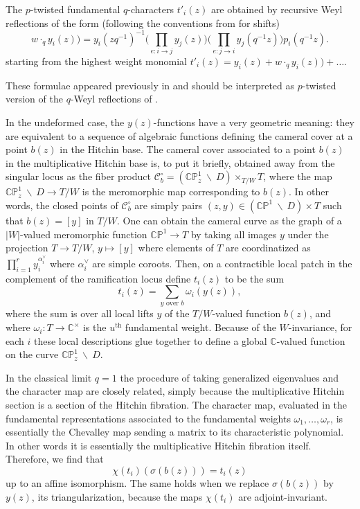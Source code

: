 \documentclass[11pt, oneside, reqno]{amsart}
\theoremstyle{definition} \newtheorem{definition}{Definition}[section]
\theoremstyle{definition} \newtheorem{remark}[definition]{Remark}
\theoremstyle{definition} \newtheorem{remarks}[definition]{Remarks}
\theoremstyle{definition} \newtheorem{question}[definition]{Question}
\theoremstyle{definition} \newtheorem*{note}{Note}
\theoremstyle{definition} \newtheorem{example}[definition]{Example}
\theoremstyle{definition} \newtheorem{examples}[definition]{Examples}
\newcommand{\bb}[1]{\mathbb{#1}}
\newcommand{\mc}[1]{\mathcal{#1}}
\newcommand{\bs}{\ \backslash \ }
\begin{document}
The $p$-twisted fundamental $q$-characters $t'_i(z)$ are obtained by recursive Weyl reflections of the form \cite{NekrasovPestun,NekrasovPestunShatashvili,Nekrasov:2015wsu} (following the conventions from \cite{Kimura:2015rgi} for shifts)
\begin{equation}
  w \cdot_q y_i(z)) = y_{i}(z q^{-1})^{-1} \Bigg(\prod_{e: i \to j} y_j(z) \Bigg) \Bigg(\prod_{e: j\to i} y_j(q^{-1} z)\Bigg)  p_{i}( q^{-1} z).
  \label{iWeyl_action}
\end{equation}
starting from the highest weight monomial $t'_i(z) = y_i(z) +  w \cdot_q y_i(z)) + \dots $. 

These formulae appeared previously in \cite{NekrasovPestun, NekrasovPestunShatashvili} and
should be interpreted as $p$-twisted version of the $q$-Weyl reflections of \cite{FrenkelReshetikhin2,FrenkelReshetikhinSTS,FrenkelReshetikhin1,Frenkel2001}.

In the undeformed case, the $y(z)$-functions have a very geometric meaning: they are equivalent to a sequence of algebraic functions defining the cameral cover at a point $b(z)$ in the Hitchin base.  The cameral cover associated to a point $b(z)$ in the multiplicative Hitchin base is, to put it briefly, obtained away from the singular locus as the fiber product $\mc C_b^\circ = (\bb{CP}^1_z \bs D) \times_{T/W} T$, where the map $\bb{CP}^1_z \bs D \to T/W$ is the meromorphic map corresponding to $b(z)$.  In other words, the closed points of $\mc C^\circ_b$ are simply pairs $(z, y) \in (\bb{CP}^1 \bs D) \times T$ such that $b(z) = [y]$ in $T/W$.  One can obtain the cameral curve as the graph of a $|W|$-valued
meromorphic function $\bb{CP}^1 \to T$ by
taking all images $y$ under the projection $T \to T/W$, $y \mapsto [y]$ where elements of $T$ are
coordinatized as  $\prod_{i = 1}^{r} y_i^{\alpha_i^{\vee}}$ where $\alpha_i^{\vee}$ are simple coroots.
Then, on a contractible local patch in the complement of the ramification locus define $t_i(z)$ to be the sum 
\[t_i(z) = \sum_{y \text{ over } b} \omega_i(y(z)),\]
where the sum is over all local lifts $y$ of the $T/W$-valued function $b(z)$, and where $\omega_i \colon T \to \mathbb{C}^{\times}$ is the $u^\text{th}$ fundamental weight. Because of the $W$-invariance, for each $i$ these local descriptions glue together to define a global $\mathbb{C}$-valued function on the curve $\bb{CP}^1_z \bs D$.

In the classical limit $q=1$ the procedure of taking generalized eigenvalues and the character map are closely related, simply because the multiplicative Hitchin section is a section of the Hitchin fibration.  The character map, evaluated in the fundamental representations associated to the fundamental weights $\omega_1, \ldots, \omega_r$, is essentially the Chevalley map sending a matrix to its characteristic polynomial.  In other words it is essentially the multiplicative Hitchin fibration itself.  Therefore, we find that 
\[\chi(t_i)(\sigma(b(z))) = t_i(z)\]
up to an affine isomorphism.  The same holds when we replace $\sigma(b(z))$ by $y(z)$, its triangularization, because the maps $\chi(t_i)$ are adjoint-invariant.
\end{document}
